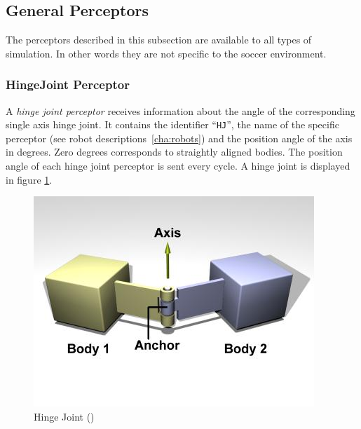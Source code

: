 




\subsection{General Perceptors}
\label{sec:generalperceptors}
The perceptors described in this subsection are available to all types of
simulation. In other words they are not specific to the soccer environment.



\subsubsection{HingeJoint Perceptor}
\label{sec:HJP}
A \emph{hinge joint perceptor} receives information about the angle of the
corresponding single axis hinge joint. It contains the identifier
``\texttt{HJ}'', the name of the specific perceptor (see robot
descriptions~\ref{cha:robots}) and the position angle of the axis in degrees.
Zero degrees corresponds to straightly aligned bodies. The position angle of
each hinge joint perceptor is sent every cycle. A hinge joint is displayed in
figure \ref{ode:hingejoint}.

\begin{figure}[htbp]
  \begin{center}
	\includegraphics[scale=0.6]{fig/HingeJoint.png}
    \caption{Hinge Joint (\cite{ODEManual})}
    \label{ode:hingejoint}
  \end{center}
\end{figure}

